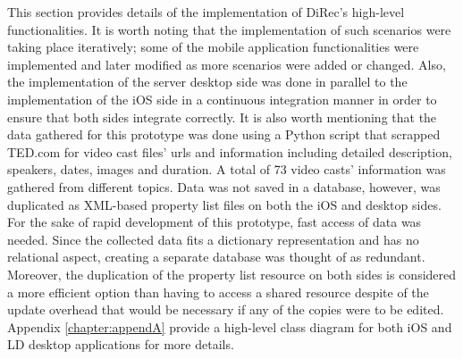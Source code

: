 This section provides details of the implementation of DiRec's high-level
functionalities. It is worth noting that the implementation of such scenarios
were taking place iteratively; some of the mobile application functionalities
were implemented and later modified as more
scenarios were added or changed. Also, the implementation of the server desktop
side was done in parallel to the implementation of the iOS side in a continuous
integration manner in order to ensure that both sides integrate correctly. It is
also worth mentioning that the data gathered for this prototype was done using a
Python script that scrapped TED.com for video cast files' urls and information
including detailed description, speakers, dates, images and duration. A total of
73 video casts' information was gathered from different topics. Data was not
saved in a database, however, was duplicated as XML-based property list files on
both the iOS and desktop sides. For the sake of rapid development of this
prototype, fast access of data was needed. Since the collected data fits a
dictionary representation and has no relational aspect, creating a separate
database was thought of as redundant. Moreover, the duplication of the property
list resource on both sides is considered a more efficient option than having
to access a shared resource despite of the update overhead that would be necessary if any of the copies were to be edited.\\
Appendix \ref{chapter:appendA} provide a high-level class diagram for both iOS
and LD desktop applications for more details.

